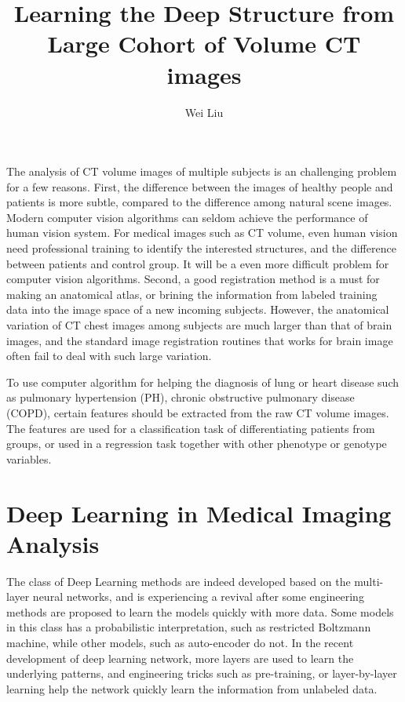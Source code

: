 \documentclass[12pt]{article}
\begin{document}
\title{Learning the Deep Structure from Large Cohort of Volume CT images}
\author{Wei Liu}

\maketitle

The analysis of CT volume images of multiple subjects is an challenging
problem for a few reasons. First, the difference between the images of healthy
people and patients is more subtle, compared to the difference among natural
scene images. Modern computer vision algorithms can seldom achieve the
performance of human vision system. For medical images such as CT volume, even
human vision need professional training to identify the interested structures,
and the difference between patients and control group. It will be a even more
difficult problem for computer vision algorithms. Second, a good registration
method is a must for making an anatomical atlas, or brining the information
from labeled training data into the image space of a new incoming
subjects. However, the anatomical variation of CT chest images among subjects
are much larger than that of brain images, and the standard image registration
routines that works for brain image often fail to deal with such large
variation. 

To use computer algorithm for helping the diagnosis of lung or heart disease
such as pulmonary hypertension (PH), chronic obstructive pulmonary disease
(COPD), certain features should be extracted from the raw CT volume
images. The features are used for a classification task of differentiating
patients from groups, or used in a regression task together with other
phenotype or genotype variables. 

\section{Deep Learning in Medical Imaging Analysis}
The class of Deep Learning methods are indeed developed based on the
multi-layer neural networks, and is experiencing a revival after some
engineering methods are proposed to learn the models quickly with more
data. Some models in this class has a probabilistic interpretation, such as
restricted Boltzmann machine, while other models, such as auto-encoder do
not. In the recent development of deep learning network, more layers are used
to learn the underlying patterns, and engineering tricks such as pre-training,
or layer-by-layer learning help the network quickly learn the information from
unlabeled data. 
\end{document}
